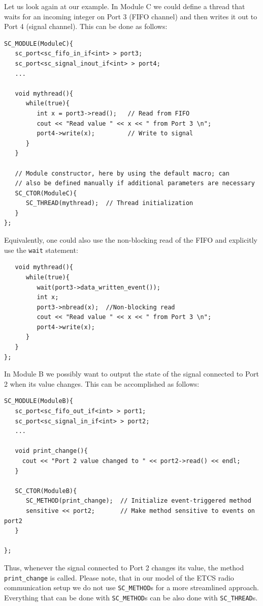 \documentclass{template/openetcs_article}
\begin{document}
Let us look again at our example. In Module C we could define a thread that waits for an incoming integer on Port 3 (FIFO channel) and then writes it out to Port 4 (signal channel). This can be done as follows:

{\small
\begin{lstlisting}
SC_MODULE(ModuleC){
   sc_port<sc_fifo_in_if<int> > port3;
   sc_port<sc_signal_inout_if<int> > port4;
   ...

   void mythread(){
      while(true){
         int x = port3->read();   // Read from FIFO
         cout << "Read value " << x << " from Port 3 \n";
         port4->write(x);         // Write to signal
      }
   }  

   // Module constructor, here by using the default macro; can
   // also be defined manually if additional parameters are necessary
   SC_CTOR(ModuleC){
      SC_THREAD(mythread);  // Thread initialization
   }
};
\end{lstlisting}
}

Equivalently, one could also use the non-blocking read of the FIFO and explicitly use the \texttt{wait} statement:

{\small
\begin{lstlisting}
   void mythread(){
      while(true){
         wait(port3->data_written_event()); 
         int x;
         port3->nbread(x);  //Non-blocking read
         cout << "Read value " << x << " from Port 3 \n";
         port4->write(x);
      }
   }  
};
\end{lstlisting}
}

In Module B we possibly want to output the state of the signal connected to Port 2 when its value changes. This can be accomplished as follows:

{\small
\begin{lstlisting}
SC_MODULE(ModuleB){
   sc_port<sc_fifo_out_if<int> > port1;
   sc_port<sc_signal_in_if<int> > port2;
   ...

   void print_change(){
     cout << "Port 2 value changed to " << port2->read() << endl;
   }

   SC_CTOR(ModuleB){
      SC_METHOD(print_change);  // Initialize event-triggered method
      sensitive << port2;       // Make method sensitive to events on port2
   }

};
\end{lstlisting}
}

Thus, whenever the signal connected to Port 2 changes its value, the method \texttt{print\_change} is called. Please note, that in our model of the ETCS radio communication setup we do not use \texttt{SC\_METHOD}s for a more streamlined approach. Everything that can be done with \texttt{SC\_METHOD}s can be also done with \texttt{SC\_THREAD}s.
\end{document}
